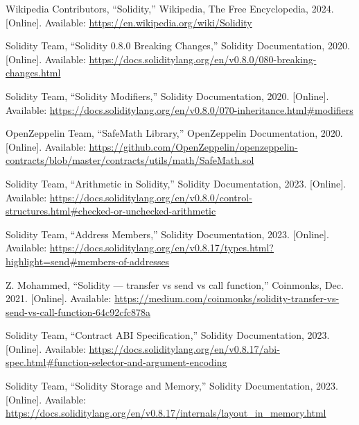 \documentclass[conference]{IEEEtran}
\begin{document}
\vspace{3em}
\begin{thebibliography}{2}
    Wikipedia Contributors,
    ``Solidity,''
    Wikipedia, The Free Encyclopedia,
    2024.
    [Online].
    Available: \url{https://en.wikipedia.org/wiki/Solidity}
    
    Solidity Team, 
    ``Solidity 0.8.0 Breaking Changes,'' 
    Solidity Documentation, 
    2020. 
    [Online]. 
    Available: \url{https://docs.soliditylang.org/en/v0.8.0/080-breaking-changes.html}

    Solidity Team,
    ``Solidity Modifiers,''
    Solidity Documentation,
    2020.
    [Online].
    Available: \url{https://docs.soliditylang.org/en/v0.8.0/070-inheritance.html#modifiers}

    OpenZeppelin Team,
    ``SafeMath Library,''
    OpenZeppelin Documentation,
    2020.
    [Online].
    Available: \url{https://github.com/OpenZeppelin/openzeppelin-contracts/blob/master/contracts/utils/math/SafeMath.sol}

    Solidity Team,
    ``Arithmetic in Solidity,''
    Solidity Documentation,
    2023.
    [Online].
    Available: \url{https://docs.soliditylang.org/en/v0.8.0/control-structures.html#checked-or-unchecked-arithmetic}

    Solidity Team,
    ``Address Members,''
    Solidity Documentation,
    2023.
    [Online].
    Available: \url{https://docs.soliditylang.org/en/v0.8.17/types.html?highlight=send#members-of-addresses}

    Z. Mohammed,
    ``Solidity — transfer vs send vs call function,''
    Coinmonks,
    Dec. 2021.
    [Online].
    Available: \url{https://medium.com/coinmonks/solidity-transfer-vs-send-vs-call-function-64c92cfc878a}

    Solidity Team,
    ``Contract ABI Specification,''
    Solidity Documentation,
    2023.
    [Online].
    Available: \url{https://docs.soliditylang.org/en/v0.8.17/abi-spec.html#function-selector-and-argument-encoding}

    Solidity Team,
    ``Solidity Storage and Memory,''
    Solidity Documentation,
    2023.
    [Online].
    Available: \url{https://docs.soliditylang.org/en/v0.8.17/internals/layout_in_memory.html}


\end{thebibliography}
\end{document}

